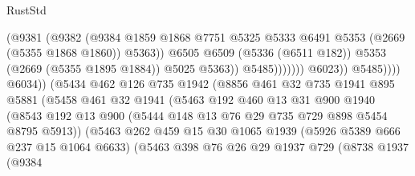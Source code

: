 \begin{lexlean}{RustStd}
\begin{coremodule}
                                              (@9381
                                                (@9382
                                                  (@9384
                                                    @1859
                                                    @1868
                                                    @7751
                                                    @5325
                                                    @5333
                                                    @6491
                                                    @5353
                                                    (@2669 (@5355 @1868 @1860))
                                                    @5363))
                                                @6505
                                                @6509
                                                (@5336 (@6511 @182))
                                                @5353
                                                (@2669 (@5355 @1895 @1884))
                                                @5025
                                                @5363))
                                            @5485)))))))
                              @6023))
                          @5485))))
                  @6034))
              (@5434
                @462
                @126
                @735
                @1942
                (@8856
                  @461
                  @32
                  @735
                  @1941
                  @895
                  @5881
                  (@5458
                    @461
                    @32
                    @1941
                    (@5463
                      @192
                      @460
                      @13
                      @31
                      @900
                      @1940
                      (@8543
                        @192
                        @13
                        @900
                        (@5444 @148 @13 @76 @29 @735 @729 @898 @5454 @8795 @5913))
                      (@5463
                        @262
                        @459
                        @15
                        @30
                        @1065
                        @1939
                        (@5926 @5389 @666 @237 @15 @1064 @6633)
                        (@5463
                          @398
                          @76
                          @26
                          @29
                          @1937
                          @729
                          (@8738
                            @1937
                            (@9384

\end{coremodule}
\end{lexlean}
